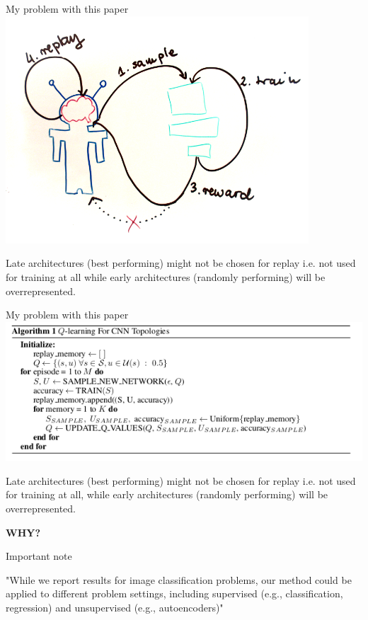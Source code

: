 \documentclass{beamer}
\begin{document}
\begin{frame}{My problem with this paper}
\includegraphics[width=0.85\textwidth]{model.png}

Late architectures (best performing) might not be chosen for replay i.e. not used for  training at all while early architectures (randomly performing) will be overrepresented.
\end{frame}

\begin{frame}{My problem with this paper}
\includegraphics[width=\textwidth]{algorithm-1.png}

Late architectures (best performing) might not be chosen for replay i.e. not used for training at all, while early architectures (randomly performing) will be overrepresented.

\vskip0.1in
\begin{center}
\textbf{WHY?}
\end{center}
\end{frame}


\begin{frame}{Important note}
  \begin{center}
  \Huge{\faLightbulbO}
\end{center}

"While we report results for image classification problems, our method could be applied to different problem settings, including supervised (e.g., classification, regression) and unsupervised (e.g., autoencoders)"
\end{frame}
\end{document}
